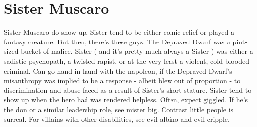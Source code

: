 \documentclass[12pt]{book}
\begin{document}
\chapter{Sister Muscaro}

Sister Muscaro do show up, Sister tend to be either comic relief or played a fantasy creature. But then, there's these guys. The Depraved Dwarf was a pint-sized bucket of malice. Sister ( and it's pretty much always a Sister ) was either a sadistic psychopath, a twisted rapist, or at the very least a violent, cold-blooded criminal. Can go hand in hand with the napoleon, if the Depraved Dwarf's misanthropy was implied to be a response - albeit blew out of proportion - to discrimination and abuse faced as a result of Sister's short stature. Sister tend to show up when the hero had was rendered helpless. Often, expect giggled. If he's the don or a similar leadership role, see mister big. Contrast little people is surreal. For villains with other disabilities, see evil albino and evil cripple.
\end{document}
